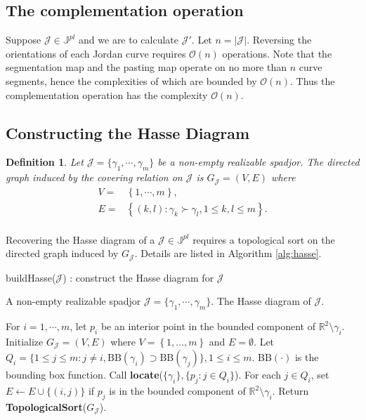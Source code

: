 \documentclass[a4paper]{article}
\newtheorem{definition}{Definition}
\newcommand{\bJpl}{\mathbb{J}^{pl}}
\newcommand{\cJ}{\mathcal{J}}
\newcommand{\bigO}[1]{\mathcal{O}(#1)}
\begin{document}
\subsection{The complementation operation}

Suppose $\cJ \in \bJpl$ and we are to calculate $\cJ'$. 
Let $n = \vert \cJ \vert$. 
Reversing the orientations of each Jordan curve requires $\bigO{n}$ operations. 
Note that the segmentation map and the pasting map
operate on no more than $n$ curve segments, 
hence the complexities of which are bounded by $\bigO{n}$. 
Thus the complementation operation has the complexity $\bigO{n}$. 

\subsection{Constructing the Hasse Diagram}

\begin{definition}
Let $\cJ = \{\gamma_1,\cdots,\gamma_m\}$ be a non-empty realizable spadjor. 
  The directed graph induced by the covering relation on $\cJ$ is $G_{\cJ} = (V,E)$ where
  \begin{equation}
    \begin{aligned}
      V =& \left\{ 1,\cdots,m \right\},  \\
      E =& \left\{ (k,l) : \gamma_k \succ \gamma_l, 1 \le k,l \le m  \right\}.  \\
    \end{aligned}
  \end{equation}
\end{definition}

\newcommand{\BB}[1]{\text{BB}(#1)}

Recovering the Hasse diagram of a $\cJ \in \bJpl$ 
requires a topological sort on the directed graph induced by $G_{\cJ}$.
Details are listed in Algorithm \ref{alg:hasse}. 

\begin{algorithm}[htbp]
  \caption{buildHasse($\cJ$) : construct the Hasse diagram for $\cJ$}
  \label{alg:hasse}
  \begin{algorithmic}[1]
    \renewcommand{\algorithmicrequire}{\textbf{Input : }}
    \REQUIRE A non-empty realizable spadjor $\cJ = \{\gamma_1,\cdots,\gamma_m\}$.
    \renewcommand{\algorithmicensure}{\textbf{Output : }}
    \ENSURE The Hasse diagram of $\cJ$.
    
    \STATE For $i=1,\cdots,m$,
    let $p_i$ be an interior point
    in the bounded component of $\mathbb{R}^2 \setminus \gamma_i$. 
    \STATE Initialize $G_{\cJ} = (V,E)$ where 
    $V = \left\{1, \ldots, m\right\}$ and $E = \emptyset$.
    \STATE Let $Q_i = \{ 1 \le j \le m : j \ne i, \BB{\gamma_i} \supset \BB{\gamma_j} \}, 1 \le i \le m$. 
    $\BB{\cdot}$ is the bounding box function. 
    \STATE
    \STATE Call \textbf{locate}($\{\gamma_i\}, \{p_j : j \in Q_i\}$).
    \STATE For each $j \in Q_i$, set $E \leftarrow E \cup \{(i, j)\}$ 
    if $p_j$ is in the bounded component of $\mathbb{R}^2 \setminus \gamma_i$. 
    \ENDFOR
    \STATE Return \textbf{TopologicalSort}($G_{\cJ}$). 
  \end{algorithmic}
\end{algorithm}
\end{document}
